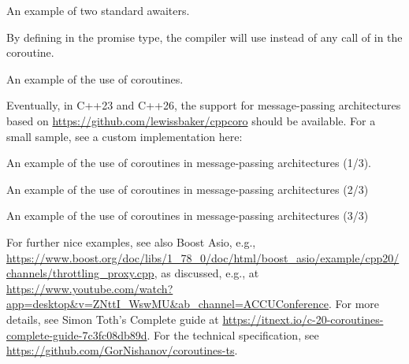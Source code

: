 \begin{itemize}
\begin{end}
\raggedbottom
\begin{codebox}[]{\href{https://godbolt.org/z/}{\ExternalLink}}
\footnotesize An example of two standard awaiters.
\tcblower
{}
\end{codebox}

By defining  in the promise type, the compiler will use  instead of any call of  in the coroutine. 

\raggedbottom
\begin{codebox}[]{\href{https://godbolt.org/z/}{\ExternalLink}}
\footnotesize An example of the use of coroutines.
\tcblower
{}
\end{codebox}

Eventually, in C++23 and C++26, the support for message-passing architectures based on \url{https://github.com/lewissbaker/cppcoro} should be available. For a small sample, see a custom implementation here:

\raggedbottom
\begin{codebox}[]{\href{https://godbolt.org/z/}{\ExternalLink}}
\footnotesize An example of the use of coroutines in message-passing architectures (1/3).
\tcblower
{}
\end{codebox}

\raggedbottom
\begin{codebox}[]{\href{https://godbolt.org/z/}{\ExternalLink}}
\footnotesize An example of the use of coroutines in message-passing architectures (2/3)
\tcblower
{}
\end{codebox}

\raggedbottom
\begin{codebox}[]{\href{https://godbolt.org/z/}{\ExternalLink}}
\footnotesize An example of the use of coroutines in message-passing architectures (3/3)
\tcblower
{}
\end{codebox}

For further nice examples, see also Boost Asio, e.g.,
\url{https://www.boost.org/doc/libs/1_78_0/doc/html/boost_asio/example/cpp20/channels/throttling_proxy.cpp}, 
as discussed, e.g., at
\url{https://www.youtube.com/watch?app=desktop&v=ZNttI_WswMU&ab_channel=ACCUConference}.
For more details, see Simon Toth's Complete guide at \url{https://itnext.io/c-20-coroutines-complete-guide-7c3fc08db89d}.
For the technical specification, see \url{https://github.com/GorNishanov/coroutines-ts}.


\end{end}
\end{itemize}
